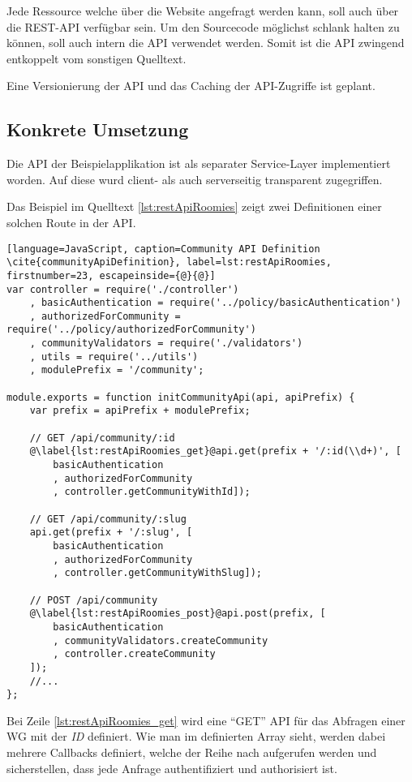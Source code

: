 Jede Ressource welche über die Website angefragt werden kann, soll auch über die REST-API verfügbar sein. Um den Sourcecode möglichst schlank halten zu können, soll auch intern die API verwendet werden.
Somit ist die API zwingend entkoppelt vom sonstigen Quelltext.

Eine Versionierung der API und das Caching der API-Zugriffe ist geplant.

\subsection*{Konkrete Umsetzung}
Die API der Beispielapplikation ist als separater Service-Layer implementiert worden. Auf diese wurd client- als auch serverseitig transparent zugegriffen.

Das Beispiel im Quelltext \ref{lst:restApiRoomies} zeigt zwei Definitionen einer solchen Route in der API.

\begin{lstlisting}[language=JavaScript, caption=Community API Definition \cite{communityApiDefinition}, label=lst:restApiRoomies, firstnumber=23, escapeinside={@}{@}]
var controller = require('./controller')
	, basicAuthentication = require('../policy/basicAuthentication')
	, authorizedForCommunity = require('../policy/authorizedForCommunity')
	, communityValidators = require('./validators')
	, utils = require('../utils')
	, modulePrefix = '/community';

module.exports = function initCommunityApi(api, apiPrefix) {
	var prefix = apiPrefix + modulePrefix;

	// GET /api/community/:id
	@\label{lst:restApiRoomies_get}@api.get(prefix + '/:id(\\d+)', [
		basicAuthentication
		, authorizedForCommunity
		, controller.getCommunityWithId]);

	// GET /api/community/:slug
	api.get(prefix + '/:slug', [
		basicAuthentication
		, authorizedForCommunity
		, controller.getCommunityWithSlug]);

	// POST /api/community
	@\label{lst:restApiRoomies_post}@api.post(prefix, [
		basicAuthentication
		, communityValidators.createCommunity
		, controller.createCommunity
	]);
	//...
};
\end{lstlisting}

Bei Zeile \autoref{lst:restApiRoomies_get} wird eine ``GET'' API für das Abfragen einer WG mit der \emph{ID} definiert. Wie man im definierten Array sieht, werden dabei mehrere Callbacks definiert, welche der Reihe nach aufgerufen werden und sicherstellen, dass jede Anfrage authentifiziert und authorisiert ist.

